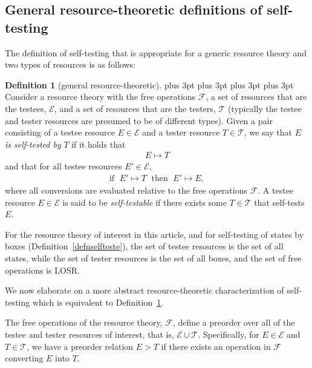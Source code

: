 \documentclass[12pt]{article}
\theoremstyle{plain}
\theoremstyle{definition}
\newtheorem{defn}{Definition}
\begin{document}
\begin{appendices}
\section{General resource-theoretic definitions of self-testing} \label{equivdefnself}


The definition of self-testing that is appropriate for a generic resource theory and two types of resources is as follows:
\begin{defn}[general resource-theoretic]\label{defnselftesteGeneral}
{
\abovedisplayskip=1pt plus 3pt
\belowdisplayskip=1pt plus 3pt
\abovedisplayshortskip=1pt plus 3pt
\belowdisplayshortskip=1pt plus 3pt
Consider a resource theory with the free operations $\mathcal{F}$, a set of resources that are the testees, $\mathcal{E}$,
 and a set of resources that are the testers, $\mathcal{T}$
  (typically the testee and tester resources are presumed to be of different types).  Given a pair consisting of a testee resource $E \in \mathcal{E}$ and a tester resource $T \in\mathcal{T}$, we say that $E$  {\em is self-tested by} $T$ 
   if it holds that
\begin{align}
E \mapsto T \nonumber
\end{align}
 and that for all testee resources $E' \in \mathcal{E}$,
\begin{align} 
\textrm{if }\; E' \mapsto T \; \textrm{ then }\; E' \mapsto E,\nonumber
\end{align}
where all conversions are evaluated relative to the free operations $\mathcal{F}$. A testee resource $E \in \mathcal{E}$ is said to be {\em self-testable} 
 if there exists some $T \in \mathcal{T}$ that self-tests $E$.
}
\end{defn}

For the resource theory of interest in this article, and for self-testing of states by boxes (Definition~\ref{defnselfteste}), the set of testee resources is the set of all states, while
the set of tester resources is the set of all boxes,
 and the set of free operations is LOSR.

We now elaborate on a more abstract resource-theoretic characterization of self-testing which is equivalent to Definition~\ref{defnselftesteGeneral}.

The free operations of the resource theory, $\mathcal{F}$, define a preorder over all of the testee and tester resources of interest, that is,  $\mathcal{E}\cup \mathcal{T}$.   Specifically, for $E\in \mathcal{E}$ and $T \in \mathcal{T}$, we have a preorder relation $E > T$ if there exists an operation in $\mathcal{F}$ converting $E$ into $T$. 


\end{appendices}
\end{document}
